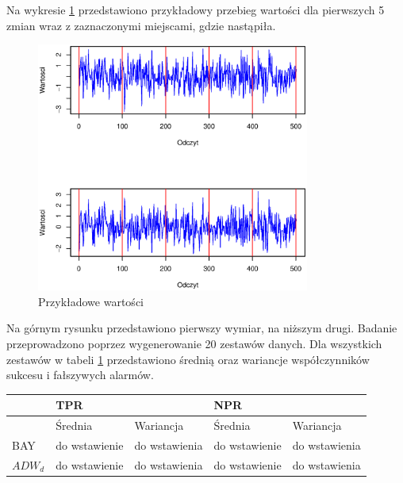 Na wykresie \ref{fig:CovValues} przedstawiono przykładowy przebieg wartości dla pierwszych 5 zmian
wraz z zaznaczonymi miejscami,
gdzie nastąpiła.
\begin{figure}[htbp]
  \centering
  \includegraphics[width=0.8\textwidth]{img/ch-5-cov}
  \caption{Przykładowe wartości}
  \label{fig:CovValues}
\end{figure}
Na górnym rysunku przedstawiono pierwszy wymiar, na niższym drugi.
Badanie przeprowadzono poprzez wygenerowanie 20 zestawów danych.
Dla wszystkich zestawów w tabeli \ref{tab:JumpingResult} przedstawiono średnią oraz wariancje współczynników sukcesu i fałszywych alarmów.
\begin{table}[h]
  \label{tab:JumpingResult}
  \centering
  \begin{tabular}{l r r r r}
    & \multicolumn{2}{l}{TPR} & \multicolumn{2}{l}{NPR} \\
    \hline
    & \multicolumn{1}{l}{Średnia} & \multicolumn{1}{l}{Wariancja}& \multicolumn{1}{l}{Średnia} & \multicolumn{1}{l}{Wariancja} \\
    \hline
    BAY & do wstawienie & do wstawienia & do wstawienie & do wstawienia \\
    $ADW_{d}$ & do wstawienie & do wstawienia & do wstawienie & do wstawienia \\
  \end{tabular}
\end{table}
